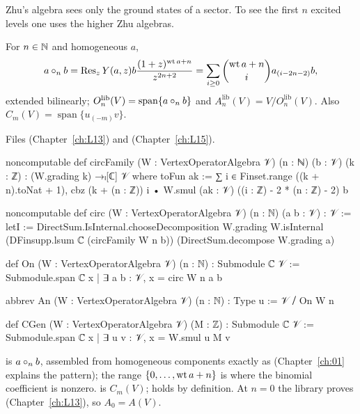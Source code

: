 Zhu's algebra sees only the ground states of a sector. To see the first $n$ excited levels one uses the higher
Zhu algebras.

\begin{definition}\label{l12:def:an}
For $n\in{\mathbb{N}}$ and homogeneous $a$,
\begin{equation*}
 a\circ_n b = \operatorname{Res}_zY(a,z)b\frac{(1+z)^{\operatorname{wt} a+n}}{z^{2n+2}} = \sum_{i\ge0}\binom{\operatorname{wt} a+n}{i}a_{(i-2n-2)}b,
\end{equation*}
extended bilinearly; $O_n^{\mathrm{lib}}(V) = \operatorname{span}\{a\circ_nb\}$ and
$A_n^{\mathrm{lib}}(V) = V/O_n^{\mathrm{lib}}(V)$. Also $C_m(V) = \operatorname{span}\{u_{(-m)}v\}$.
\end{definition}
\noindent Files  (Chapter~\ref{ch:L13}) and
 (Chapter~\ref{ch:L15}).
\begin{leancode}
noncomputable def circFamily (W : VertexOperatorAlgebra 𝒱) (n : ℕ) (b : 𝒱) (k : ℤ) :
    (W.grading k) →ₗ[ℂ] 𝒱 where
  toFun ak := ∑ i ∈ Finset.range ((k + n).toNat + 1),
    cbz (k + (n : ℤ)) i • W.smul (ak : 𝒱) ((i : ℤ) - 2 * (n : ℤ) - 2) b

noncomputable def circ (W : VertexOperatorAlgebra 𝒱) (n : ℕ) (a b : 𝒱) : 𝒱 :=
  letI := DirectSum.IsInternal.chooseDecomposition W.grading W.isInternal
  (DFinsupp.lsum ℂ (circFamily W n b)) (DirectSum.decompose W.grading a)

def On (W : VertexOperatorAlgebra 𝒱) (n : ℕ) : Submodule ℂ 𝒱 :=
  Submodule.span ℂ {x | ∃ a b : 𝒱, x = circ W n a b}

abbrev An (W : VertexOperatorAlgebra 𝒱) (n : ℕ) : Type u := 𝒱 ⧸ On W n

def CGen (W : VertexOperatorAlgebra 𝒱) (M : ℤ) : Submodule ℂ 𝒱 :=
  Submodule.span ℂ {x | ∃ u v : 𝒱, x = W.smul u M v}
\end{leancode}

\begin{dictionary}
 is $a\circ_nb$, assembled from homogeneous components exactly as  (Chapter~\ref{ch:01}
explains the  pattern); the range $\{0,\dots,\operatorname{wt} a+n\}$ is where the binomial coefficient is
nonzero.  is $C_m(V)$;  holds by definition. At $n=0$ the
library proves  (Chapter~\ref{ch:L13}), so $A_0 = A(V)$.
\end{dictionary}


